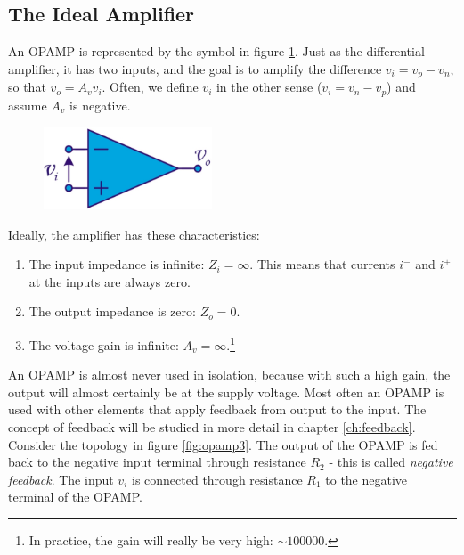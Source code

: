 \subsection{The Ideal Amplifier}
An OPAMP is represented by the symbol in figure \ref{fig:opamp2}. Just as the differential amplifier, it has two inputs, and the goal is to amplify the difference $v_i = v_p - v_n$, so that $v_o = A_v v_i$. Often, we define $v_i$ in the other sense ($v_i = v_n - v_p$) and assume $A_v$ is negative.
\begin{figure}
	\centering
	\includegraphics[width=5cm]{figures/ch02/opamp2.jpg}
	\caption{}
	\label{fig:opamp2}
\end{figure}
Ideally, the amplifier has these characteristics:
\begin{enumerate}
	\item The input impedance is infinite: $Z_i = \infty$. This means that currents $i^-$ and $i^+$ at the inputs are always zero.
	\item The output impedance is zero: $Z_o = 0$.
	\item The voltage gain is infinite: $A_v = \infty$.\footnote{In practice, the gain will really be very high: $\sim 100 000$.}
\end{enumerate}
An OPAMP is almost never used in isolation, because with such a high gain, the output will almost certainly be at the supply voltage. Most often an OPAMP is used with other elements that apply feedback from output to the input. The concept of feedback will be studied in more detail in chapter \ref{ch:feedback}.\\
Consider the topology in figure \ref{fig:opamp3}. The output of the OPAMP is fed back to the negative input terminal through resistance $R_2$ - this is called \emph{negative feedback}. The input $v_i$ is connected through resistance $R_1$ to the negative terminal of the OPAMP.


